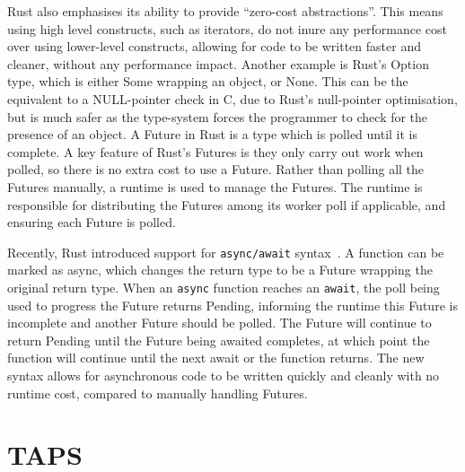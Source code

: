 Rust also emphasises its ability to provide “zero-cost abstractions”.
This means using high level constructs, such as iterators, do not inure any performance cost over using lower-level
constructs, allowing for code to be written faster and cleaner, without any performance impact.
Another example is Rust's Option type, which is either Some wrapping an object, or None.
This can be the equivalent to a NULL-pointer check in C, due to Rust's null-pointer optimisation, but is much safer as
the type-system forces the programmer to check for the presence of an object.
A Future in Rust is a type which is polled until it is complete.
A key feature of Rust's Futures is they only carry out work when polled, so there is no extra cost to use a Future.
Rather than polling all the Futures manually, a runtime is used to manage the Futures.
The runtime is responsible for distributing the Futures among its worker poll if applicable, and ensuring each Future is
polled.

Recently, Rust introduced support for \texttt{async/await} syntax~\citep{withoutboats_asyncawaitnotation_}.
A function can be marked as async, which changes the return type to be a Future wrapping the original return type.
When an \texttt{async} function reaches an \texttt{await}, the poll being used to progress the Future returns Pending,
informing the runtime this Future is incomplete and another Future should be polled.
The Future will continue to return Pending until the Future being awaited completes, at which point the function will
continue until the next await or the function returns.
The new syntax allows for asynchronous code to be written quickly and cleanly with no runtime cost, compared to manually
handling Futures.

\section{TAPS}\label{sec:taps}


